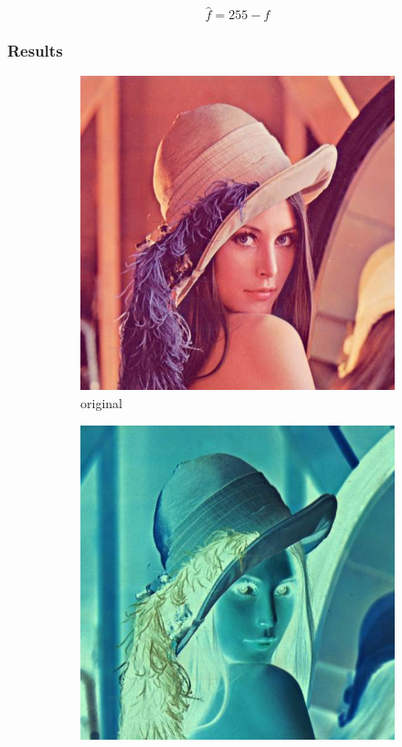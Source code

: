 \documentclass[12pt]{article}
\theoremstyle{definition}
\newcommand{\subfiguresize}{.3\textwidth}
\begin{document}
\begin{equation}
    \hat{f} = 255 - f
\end{equation}

\subsubsection{Results}

\begin{figure}[H]\centering
    \begin{subfigure}[t]{\subfiguresize}\centering
        \includegraphics[width=\textwidth]{lenac.png}
        \caption{original}
    \end{subfigure}
    \hspace{.05\textwidth}
    \begin{subfigure}[t]{\subfiguresize}\centering
        \includegraphics[width=\textwidth]{lenac_negative.png}

\end{subfigure}
\end{figure}
\end{document}
